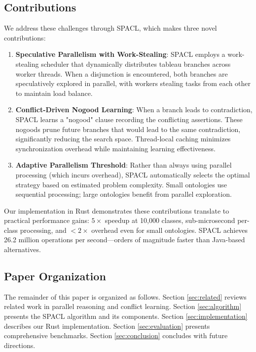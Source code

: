 \documentclass[10pt,a4paper]{article}
\begin{document}
\subsection{Contributions}

We address these challenges through SPACL, which makes three novel contributions:

\begin{enumerate}
    \item \textbf{Speculative Parallelism with Work-Stealing}: SPACL employs a work-stealing scheduler that dynamically distributes tableau branches across worker threads. When a disjunction is encountered, both branches are speculatively explored in parallel, with workers stealing tasks from each other to maintain load balance.
    
    \item \textbf{Conflict-Driven Nogood Learning}: When a branch leads to contradiction, SPACL learns a "nogood" clause recording the conflicting assertions. These nogoods prune future branches that would lead to the same contradiction, significantly reducing the search space. Thread-local caching minimizes synchronization overhead while maintaining learning effectiveness.
    
    \item \textbf{Adaptive Parallelism Threshold}: Rather than always using parallel processing (which incurs overhead), SPACL automatically selects the optimal strategy based on estimated problem complexity. Small ontologies use sequential processing; large ontologies benefit from parallel exploration.
\end{enumerate}

Our implementation in Rust demonstrates these contributions translate to practical performance gains: $5\times$ speedup at 10,000 classes, sub-microsecond per-class processing, and $<2\times$ overhead even for small ontologies. SPACL achieves 26.2 million operations per second---orders of magnitude faster than Java-based alternatives.

\subsection{Paper Organization}

The remainder of this paper is organized as follows. Section \ref{sec:related} reviews related work in parallel reasoning and conflict learning. Section \ref{sec:algorithm} presents the SPACL algorithm and its components. Section \ref{sec:implementation} describes our Rust implementation. Section \ref{sec:evaluation} presents comprehensive benchmarks. Section \ref{sec:conclusion} concludes with future directions.
\end{document}

